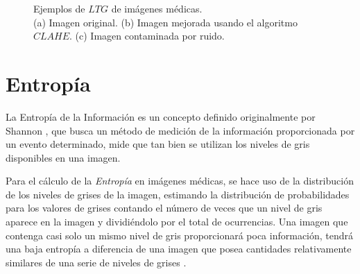 \begin{figure}[H]
    \begin{center}
    \end{center}
    \caption{Ejemplos de $LTG$ de imágenes médicas. \\
    (a) Imagen original.
    (b) Imagen mejorada usando el algoritmo $CLAHE$.
    (c) Imagen contaminada por ruido.}
    \label{fig:ltg}
\end{figure}



\section{Entropía} 
\label{sec:entropia}

La Entropía de la Información es un concepto definido originalmente por Shannon \cite{shannon}, que busca un método de medición de la información proporcionada por un evento determinado, mide que tan bien se utilizan los niveles de gris disponibles en una imagen.

Para el cálculo de la \textit{Entropía} en imágenes médicas, se hace uso de la distribución de los niveles de grises de la imagen, estimando la distribución de probabilidades para los valores de grises contando el número de veces que un nivel de gris aparece en la imagen y dividiéndolo por el total de ocurrencias. Una imagen que contenga casi solo un mismo nivel de gris proporcionará poca información, tendrá una baja entropía a diferencia de una imagen que posea cantidades relativamente similares de una serie de niveles de grises \cite{gimenezlopez}.

